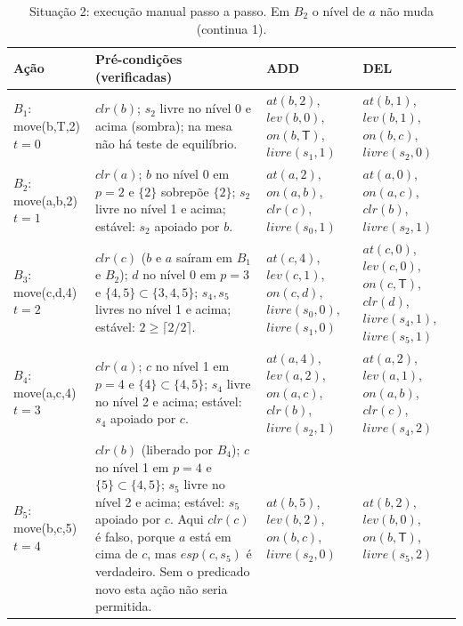 \documentclass[11pt,a4paper]{article}
\newcommand{\clr}{\mathit{clr}}
\newcommand{\at}{\mathit{at}}
\newcommand{\lev}{\mathit{lev}}
\newcommand{\livre}{\mathit{livre}}
\newcommand{\esp}{\mathit{esp}}
\newcommand{\on}{\mathit{on}}
\newcommand{\mesaT}{\mathsf{T}}
\begin{document}
\begin{table}[H]
\centering\small
\renewcommand{\arraystretch}{1.25}
\begin{tabularx}{\textwidth}{@{}p{2.3cm} X X X@{}}
\toprule
Ação & Pré-condições (verificadas) & ADD & DEL\\
\midrule
$B_1$: move(b,T,2)\newline $t=0$ &
$\clr(b)$; $s_2$ livre no nível 0 e acima (sombra); na mesa não há teste de equilíbrio. &
$\at(b,2)$, $\lev(b,0)$, $\on(b,\mesaT)$, $\livre(s_1,1)$ &
$\at(b,1)$, $\lev(b,1)$, $\on(b,c)$, $\livre(s_2,0)$\\
\midrule
$B_2$: move(a,b,2)\newline $t=1$ &
$\clr(a)$; $b$ no nível 0 em $p{=}2$ e $\{2\}$ sobrepõe $\{2\}$; $s_2$ livre no nível 1 e
acima; estável: $s_2$ apoiado por $b$. &
$\at(a,2)$, $\on(a,b)$, $\clr(c)$, $\livre(s_0,1)$ &
$\at(a,0)$, $\on(a,c)$, $\clr(b)$, $\livre(s_2,1)$\\
\midrule
$B_3$: move(c,d,4)\newline $t=2$ &
$\clr(c)$ ($b$ e $a$ saíram em $B_1$ e $B_2$); $d$ no nível 0 em $p{=}3$ e $\{4,5\}\subset\{3,4,5\}$;
$s_4,s_5$ livres no nível 1 e acima; estável: $2\ge\lceil 2/2\rceil$. &
$\at(c,4)$, $\lev(c,1)$, $\on(c,d)$, $\livre(s_0,0)$, $\livre(s_1,0)$ &
$\at(c,0)$, $\lev(c,0)$, $\on(c,\mesaT)$, $\clr(d)$, $\livre(s_4,1)$, $\livre(s_5,1)$\\
\midrule
$B_4$: move(a,c,4)\newline $t=3$ &
$\clr(a)$; $c$ no nível 1 em $p{=}4$ e $\{4\}\subset\{4,5\}$; $s_4$ livre no nível 2 e acima;
estável: $s_4$ apoiado por $c$. &
$\at(a,4)$, $\lev(a,2)$, $\on(a,c)$, $\clr(b)$, $\livre(s_2,1)$ &
$\at(a,2)$, $\lev(a,1)$, $\on(a,b)$, $\clr(c)$, $\livre(s_4,2)$\\
\midrule
$B_5$: move(b,c,5)\newline $t=4$ &
$\clr(b)$ (liberado por $B_4$); $c$ no nível 1 em $p{=}4$ e $\{5\}\subset\{4,5\}$; $s_5$ livre
no nível 2 e acima; estável: $s_5$ apoiado por $c$. Aqui $\clr(c)$ é falso, porque $a$ está em cima de $c$, mas $\esp(c,s_5)$ é
verdadeiro. Sem o predicado novo esta ação não seria permitida. &
$\at(b,5)$, $\lev(b,2)$, $\on(b,c)$, $\livre(s_2,0)$ &
$\at(b,2)$, $\lev(b,0)$, $\on(b,\mesaT)$, $\livre(s_5,2)$\\
\bottomrule
\end{tabularx}
\caption{Situação 2: execução manual passo a passo. Em $B_2$ o nível de $a$ não muda (continua 1).}
\label{tab:passos2}
\end{table}
\end{document}
